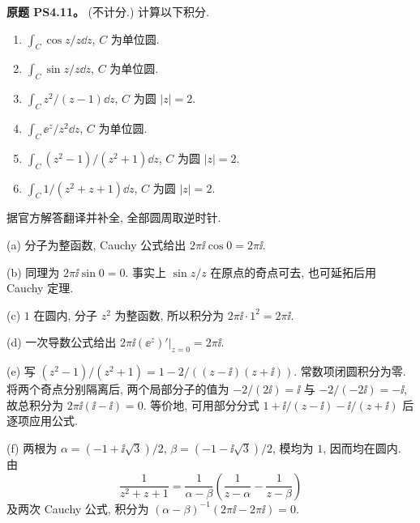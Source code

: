 \begin{exercise}\label{ass:ps4-11}
\textbf{原题 PS4.11。} (不计分.) 计算以下积分.
\begin{enumerate}[label=(\alph*)]
\item $\int_C\cos z/z\dd z$, $C$ 为单位圆.
\item $\int_C\sin z/z\dd z$, $C$ 为单位圆.
\item $\int_Cz^2/(z-1)\dd z$, $C$ 为圆 $|z|=2$.
\item $\int_C\ee^z/z^2\dd z$, $C$ 为单位圆.
\item $\int_C(z^2-1)/(z^2+1)\dd z$, $C$ 为圆 $|z|=2$.
\item $\int_C1/(z^2+z+1)\dd z$, $C$ 为圆 $|z|=2$.
\end{enumerate}
\end{exercise}
\begin{solution}
据官方解答翻译并补全, 全部圆周取逆时针.

(a) 分子为整函数, Cauchy 公式给出 $2\pi\ii\cos0=2\pi\ii$.

(b) 同理为 $2\pi\ii\sin0=0$. 事实上 $\sin z/z$ 在原点的奇点可去, 也可延拓后用 Cauchy 定理.

(c) $1$ 在圆内, 分子 $z^2$ 为整函数, 所以积分为 $2\pi\ii\cdot1^2=2\pi\ii$.

(d) 一次导数公式给出 $2\pi\ii(\ee^z)'|_{z=0}=2\pi\ii$.

(e) 写 $(z^2-1)/(z^2+1)=1-2/((z-\ii)(z+\ii))$.
常数项闭圆积分为零. 将两个奇点分别隔离后, 两个局部分子的值为
$-2/(2\ii)=\ii$ 与 $-2/(-2\ii)=-\ii$, 故总积分为
$2\pi\ii(\ii-\ii)=0$. 等价地, 可用部分分式
$1+\ii/(z-\ii)-\ii/(z+\ii)$ 后逐项应用公式.

(f) 两根为 $\alpha=(-1+\ii\sqrt3)/2$, $\beta=(-1-\ii\sqrt3)/2$, 模均为 $1$, 因而均在圆内.
由
\[
 \frac1{z^2+z+1}
 =\frac1{\alpha-\beta}\left(\frac1{z-\alpha}-\frac1{z-\beta}\right)
\]
及两次 Cauchy 公式, 积分为
$(\alpha-\beta)^{-1}(2\pi\ii-2\pi\ii)=0$.
\end{solution}
